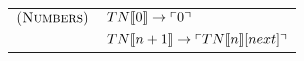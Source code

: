 \begin{table}[h]
\begin{center}
\begin{tabular}[c]{ll}
  $\textsc{(Numbers})$ 	& $TN\llbracket 0 \rrbracket \rightarrow \ulcorner 0 \urcorner$\\
  					& $TN\llbracket n+1 \rrbracket \rightarrow \ulcorner TN\llbracket n \rrbracket[next] \urcorner$
\end{tabular}
\end{center}
\caption{}
\label{tab:}
\end{table}


\FloatBarrier





\grid
\grids
